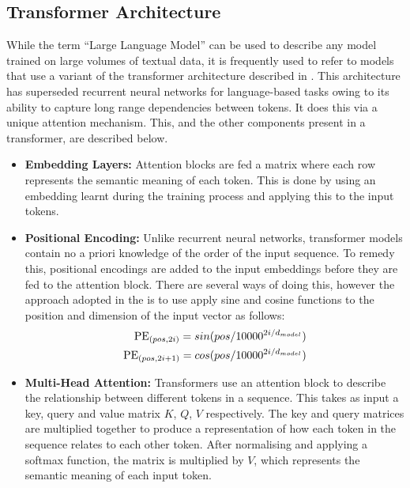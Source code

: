 \documentclass[11pt,twoside]{report}
\begin{document}
\subsection{Transformer Architecture}
While the term ``Large Language Model'' can be used to describe any model trained on large volumes of textual data, it is frequently used to refer to models that use a variant of the transformer architecture described in \cite{vaswani2017attention}.
This architecture has superseded recurrent neural networks for language-based tasks owing to its ability to capture long range dependencies between tokens.
It does this via a unique attention mechanism.
This, and the other components present in a transformer, are described below.
\begin{itemize}
  \item \textbf{Embedding Layers:} 
    Attention blocks are fed a matrix where each row represents the semantic meaning of each token. This is done by using an embedding learnt during the training process and applying this to the input tokens.
  \item \textbf{Positional Encoding:} 
    Unlike recurrent neural networks, transformer models contain no a priori knowledge of the order of the input sequence.
    To remedy this, positional encodings are added to the input embeddings before they are fed to the attention block.
    There are several ways of doing this, however the approach adopted in the \cite{vaswani2017attention} is to use apply sine and cosine functions to the position and dimension of the input vector as follows:
    \begin{equation*}
      \begin{split}
        \textnormal{PE}_{(pos, 2i)} = sin(pos/10000^{2i/d_{model}}) \\ 
        \textnormal{PE}_{(pos, 2i+1)} = cos(pos/10000^{2i/d_{model}})
      \end{split}
    \end{equation*}
  \item \textbf{Multi-Head Attention:}
    Transformers use an attention block to describe the relationship between different tokens in a sequence. 
    This takes as input a key, query and value matrix $K$, $Q$, $V$ respectively. 
    The key and query matrices are multiplied together to produce a representation of how each token in the sequence relates to each other token.
    After normalising and applying a softmax function, the matrix is multiplied by $V$, which represents the semantic meaning of each input token.
    \begin{equation*}

\end{equation*}
\end{itemize}
\end{document}
